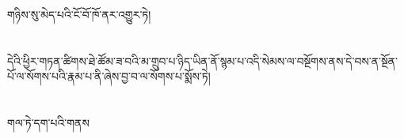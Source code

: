 གཉིས་སུ་མེད་པའི་ངོ་བོ་ཁོ་ནར་འགྱུར་ཏེ།\chapter{ }དེའི་ཕྱིར་གཏན་ཚིགས་ཐེ་ཚོམ་ཟ་བའི་མ་གྲུབ་པ་ཉིད་ཡིན་ནོ་སྙམ་པ་འདི་སེམས་ལ་བསྔོགས་ནས་དེ་བས་ན་སྔོན་པོ་ལ་སོགས་པའི་རྣམ་པ་ནི་ཞེས་བྱ་བ་ལ་སོགས་པ་སྨོས་ཏེ།\chapter{ }གལ་ཏེ་དག་པའི་གནས